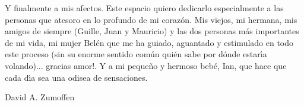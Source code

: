 Y finalmente a mis afectos. Este espacio quiero dedicarlo especialmente a las personas que atesoro en lo
profundo de mi coraz{\'o}n. Mis viejos, mi hermana, mis amigos de siempre (Guille, Juan y Mauricio) y las dos
personas m{\'a}s importantes de mi vida, mi mujer Bel{\'e}n que me ha guiado, aguantado y estimulado en todo este
proceso (sin su enorme sentido com{\'u}n qui{\'e}n sabe por d{\'o}nde estar{\'\i}a volando)... gracias amor!. Y a mi peque{\~n}o
y hermoso beb{\'e}, Ian, que hace que cada d{\'\i}a sea una odisea de sensaciones.

\selectfont
\begin{flushright}
David A. Zumoffen
\end{flushright}
\sffamily

